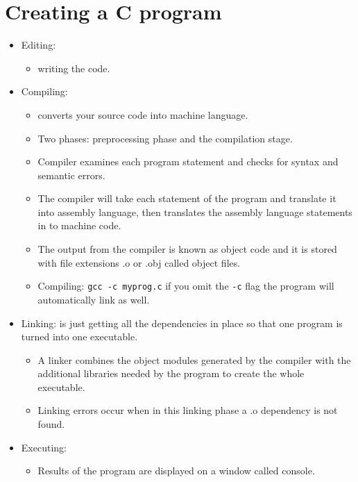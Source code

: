 \section{Creating a C program}
\begin{itemize}
    \item Editing: 
        \begin{itemize}
            \item writing the code.
        \end{itemize}
    \item Compiling:
        \begin{itemize}
            \item converts your source code into machine language. 
            \item Two phases: preprocessing phase and the compilation stage. 
            \item Compiler examines each program statement and checks for syntax and semantic errors. 
            \item The compiler will take each statement of the program and translate it into assembly language, then translates the assembly language statements in to machine code. 
            \item The output from the compiler is known as object code and it is stored with file extensions .o or .obj called object files.
            \item Compiling: \verb|gcc -c myprog.c| if you omit the \verb|-c| flag the program will automatically link as well. 
        \end{itemize}
    \item Linking: is just getting all the dependencies in place so that one program is turned into one executable. 
        \begin{itemize}
            \item A linker combines the object modules generated by the compiler with the additional libraries needed by the program to create the whole executable.
            \item Linking errors occur when in this linking phase a .o dependency is not found. 
        \end{itemize}
    \item Executing:
        \begin{itemize}
            \item Results of the program are displayed on a window called console. 
        \end{itemize}
\end{itemize}


